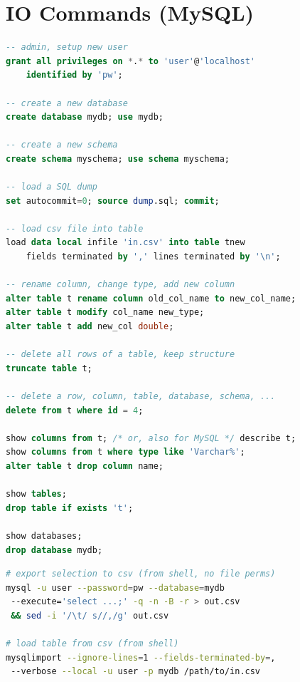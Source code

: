 \section{IO Commands (MySQL)}
\label{sql:io}

\begin{lstlisting}[language=SQL]
-- admin, setup new user
grant all privileges on *.* to 'user'@'localhost'
	identified by 'pw';

-- create a new database
create database mydb; use mydb;

-- create a new schema
create schema myschema; use schema myschema;

-- load a SQL dump
set autocommit=0; source dump.sql; commit;

-- load csv file into table
load data local infile 'in.csv' into table tnew
	fields terminated by ',' lines terminated by '\n';

-- rename column, change type, add new column
alter table t rename column old_col_name to new_col_name;
alter table t modify col_name new_type;
alter table t add new_col double;

-- delete all rows of a table, keep structure
truncate table t;

-- delete a row, column, table, database, schema, ...
delete from t where id = 4;

show columns from t; /* or, also for MySQL */ describe t;
show columns from t where type like 'Varchar%';
alter table t drop column name;

show tables;
drop table if exists 't';

show databases;
drop database mydb;
\end{lstlisting}

\begin{lstlisting}[language=bash]
# export selection to csv (from shell, no file perms)
mysql -u user --password=pw --database=mydb
 --execute='select ...;' -q -n -B -r > out.csv
 && sed -i '/\t/ s//,/g' out.csv

# load table from csv (from shell)
mysqlimport --ignore-lines=1 --fields-terminated-by=,
 --verbose --local -u user -p mydb /path/to/in.csv
\end{lstlisting}
